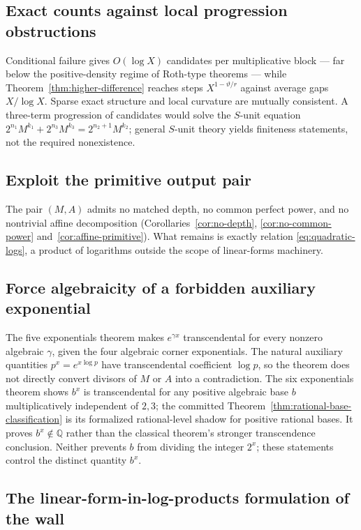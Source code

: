 \documentclass[11pt,oneside]{article}
\theoremstyle{definition}
\theoremstyle{remark}
\newcommand{\Q}{\mathbb Q}
\newcommand{\thetaq}{\vartheta}
\begin{document}
\subsection{Exact counts against local progression obstructions}
Conditional failure gives $O(\log X)$ candidates per multiplicative block --- far below the
positive-density regime of Roth-type theorems --- while
Theorem~\ref{thm:higher-difference} reaches steps $X^{1-\thetaq/r}$ against average gaps
$X/\log X$.  Sparse exact structure and local curvature are mutually consistent.  A
three-term progression of candidates would solve the $S$-unit equation
$2^{n_1}M^{k_1}+2^{n_3}M^{k_3}=2^{n_2+1}M^{k_2}$; general $S$-unit theory yields finiteness
statements, not the required nonexistence.

\subsection{Exploit the primitive output pair}
The pair $(M,A)$ admits no matched depth, no common perfect power, and no nontrivial affine
decomposition (Corollaries~\ref{cor:no-depth}, \ref{cor:no-common-power} and~\ref{cor:affine-primitive}).  What remains
is exactly relation \eqref{eq:quadratic-logs}, a product of logarithms outside the scope of
linear-forms machinery.

\subsection{Force algebraicity of a forbidden auxiliary exponential}
The five exponentials theorem \cite{WaldschmidtVariations,Roy1992} makes $e^{\gamma x}$
transcendental for every nonzero algebraic $\gamma$, given the four algebraic corner
exponentials.  The natural auxiliary quantities $p^x=e^{x\log p}$ have transcendental
coefficient $\log p$, so the theorem does not directly convert divisors of $M$ or $A$ into
a contradiction.  The six exponentials theorem shows $b^x$ is transcendental for any
positive algebraic base $b$ multiplicatively independent of $2,3$; the committed
Theorem~\ref{thm:rational-base-classification} is its formalized rational-level shadow for
positive rational bases.  It proves $b^x\notin\Q$ rather than the classical theorem's stronger
transcendence conclusion.  Neither prevents $b$ from dividing the integer $2^x$; these
statements control the distinct quantity $b^x$.

\subsection{The linear-form-in-log-products formulation of the wall}
\end{document}
